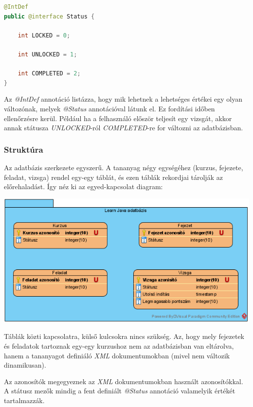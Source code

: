 \documentclass[12pt,a4paper]{article}
\newcommand{\xml}{\textit{XML}\xspace}
\begin{document}
	\begin{lstlisting}[language=Java]
@IntDef
public @interface Status {

	int LOCKED = 0;
		
	int UNLOCKED = 1;
		
	int COMPLETED = 2;
}
	\end{lstlisting}
	
	Az \textit{@IntDef} annotáció listázza, hogy mik lehetnek a lehetséges értékei egy olyan változónak, melyek \textit{@Status} annotációval látunk el. Ez fordítási időben ellenőrzésre kerül. Például ha a felhasználó először teljesít egy vizsgát, akkor annak státusza \textit{UNLOCKED}-ról \textit{COMPLETED}-re for változni az adatbázisban.
	 
	\subsubsection{Struktúra}\label{adatbazis_struktura}
	 
	Az adatbázis szerkezete egyszerű. A tananyag négy egységéhez (kurzus, fejezete, feladat, vizsga) rendel egy-egy táblát, és ezen táblák rekordjai tárolják az előrehaladást. Így néz ki az egyed-kapcsolat diagram:
	
	\begin{center}
		\includegraphics[width=\linewidth]{db_model}
	\end{center}
	
	Táblák közti kapcsolatra, külső kulcsokra nincs szükség. Az, hogy mely fejezetek és feladatok tartoznak egy-egy kurzushoz nem az adatbázisban van eltárolva, hanem a tananyagot definiáló \xml dokumentumokban (mivel nem változik dinamikusan).
	
	Az azonosítók megegyeznek az \xml dokumentumokban használt azonosítókkal. A státusz mezők mindig a fent definiált \textit{@Status} annotáció valamelyik értékét tartalmazzák.
	
\end{document}
